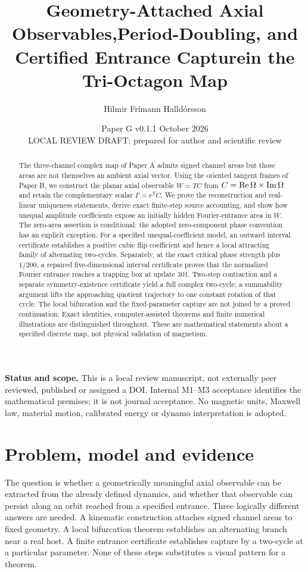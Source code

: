 \documentclass[11pt,a4paper]{article}
\title{\vspace{-10mm}Geometry-Attached Axial Observables,\newline Period-Doubling, and Certified Entrance Capture\newline in the Tri-Octagon Map}
\author{Hilmir Frímann Halldórsson}
\date{Paper G v0.1.1 \quad 4 October 2026\\\small LOCAL REVIEW DRAFT: prepared for author and scientific review}
\begin{document}
\maketitle\thispagestyle{fancy}
\begin{abstract}
The three-channel complex map of Paper A admits signed channel areas but those areas are not themselves an ambient axial vector. Using the oriented tangent frames of Paper B, we construct the planar axial observable $W=TC$ from $C=\operatorname{Re}\Omega\times\operatorname{Im}\Omega$ and retain the complementary scalar $\Gamma=e^TC$. We prove the reconstruction and real-linear uniqueness statements, derive exact finite-step source accounting, and show how unequal amplitude coefficients expose an initially hidden Fourier-entrance area in $W$. The zero-area assertion is conditional: the adopted zero-component phase convention has an explicit exception. For a specified unequal-coefficient model, an outward interval certificate establishes a positive cubic flip coefficient and hence a local attracting family of alternating two-cycles. Separately, at the exact critical phase strength plus $1/200$, a repaired five-dimensional interval certificate proves that the normalized Fourier entrance reaches a trapping box at update 301. Two-step contraction and a separate symmetry-existence certificate yield a full complex two-cycle; a summability argument lifts the approaching quotient trajectory to one constant rotation of that cycle. The local bifurcation and the fixed-parameter capture are not joined by a proved continuation. Exact identities, computer-assisted theorems and finite numerical illustrations are distinguished throughout. These are mathematical statements about a specified discrete map, not physical validation of magnetism.
\end{abstract}
\textbf{Status and scope.} This is a local review manuscript, not externally peer reviewed, published or assigned a DOI. Internal M1--M3 acceptance identifies the mathematical premises; it is not journal acceptance. No magnetic units, Maxwell law, material motion, calibrated energy or dynamo interpretation is adopted.

\section{Problem, model and evidence}
The question is whether a geometrically meaningful axial observable can be extracted from the already defined dynamics, and whether that observable can persist along an orbit reached from a specified entrance. Three logically different answers are needed. A kinematic construction attaches signed channel areas to fixed geometry. A local bifurcation theorem establishes an alternating branch near a real host. A finite entrance certificate establishes capture by a two-cycle at a particular parameter. None of these steps substitutes a visual pattern for a theorem.
\end{document}
